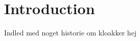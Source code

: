 \chapter{Introduction}
\label{ch:introduction}

Indled med noget historie om kloakker hej





  


